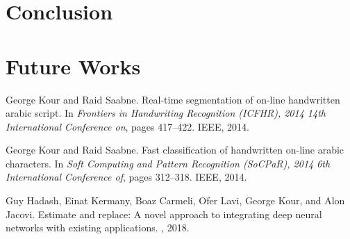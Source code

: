 \documentclass{article}
\begin{document}
\section{Conclusion}

\section{Future Works}


  


\begin{thebibliography}{1}

George Kour and Raid Saabne.
\newblock Real-time segmentation of on-line handwritten arabic script.
\newblock In {\em Frontiers in Handwriting Recognition (ICFHR), 2014 14th
  International Conference on}, pages 417--422. IEEE, 2014.

George Kour and Raid Saabne.
\newblock Fast classification of handwritten on-line arabic characters.
\newblock In {\em Soft Computing and Pattern Recognition (SoCPaR), 2014 6th
  International Conference of}, pages 312--318. IEEE, 2014.

Guy Hadash, Einat Kermany, Boaz Carmeli, Ofer Lavi, George Kour, and Alon
  Jacovi.
\newblock Estimate and replace: A novel approach to integrating deep neural
  networks with existing applications.
, 2018.

\end{thebibliography}
\end{document}
